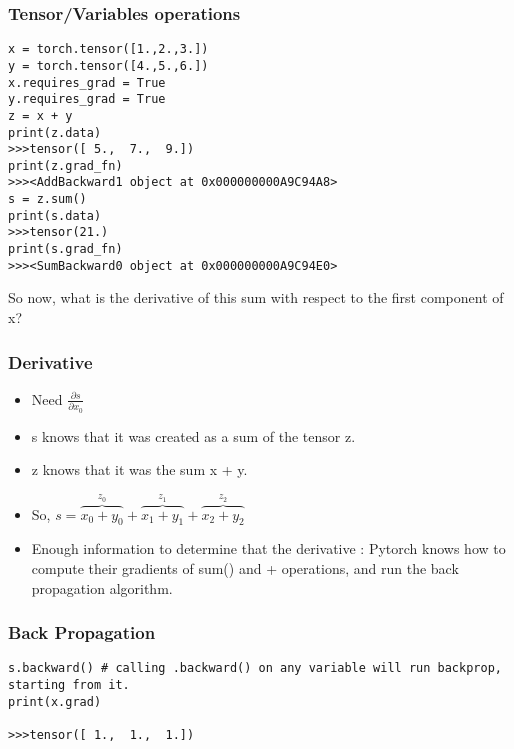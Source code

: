  
  
\begin{frame}[fragile]
\frametitle{Tensor/Variables operations}

 \begin{lstlisting}
x = torch.tensor([1.,2.,3.])
y = torch.tensor([4.,5.,6.])
x.requires_grad = True
y.requires_grad = True
z = x + y
print(z.data)
>>>tensor([ 5.,  7.,  9.])
print(z.grad_fn)
>>><AddBackward1 object at 0x000000000A9C94A8>
s = z.sum()
print(s.data)
>>>tensor(21.)
print(s.grad_fn)
>>><SumBackward0 object at 0x000000000A9C94E0>
 \end{lstlisting}
So now, what is the derivative of this sum with respect to the first component of x? 
 \end{frame} 
 
\begin{frame}[fragile]
\frametitle{Derivative}
\begin{itemize}
\item Need $\frac{\partial s}{\partial x_0}$
\item s knows that it was created as a sum of the tensor z. 
\item z knows that it was the sum x + y. 
\item So, $s = \overbrace{x_0 + y_0}^\text{$z_0$} + \overbrace{x_1 + y_1}^\text{$z_1$} + \overbrace{x_2 + y_2}^\text{$z_2$}$
\item Enough information to determine that the derivative : Pytorch knows how to compute their gradients of sum() and + operations, and run the back propagation algorithm. 
\end{itemize}


\end{frame} 
 
\begin{frame}[fragile]
\frametitle{Back Propagation}

 \begin{lstlisting}
s.backward() # calling .backward() on any variable will run backprop, starting from it.
print(x.grad)

>>>tensor([ 1.,  1.,  1.])
 \end{lstlisting}

\end{frame} 
 
